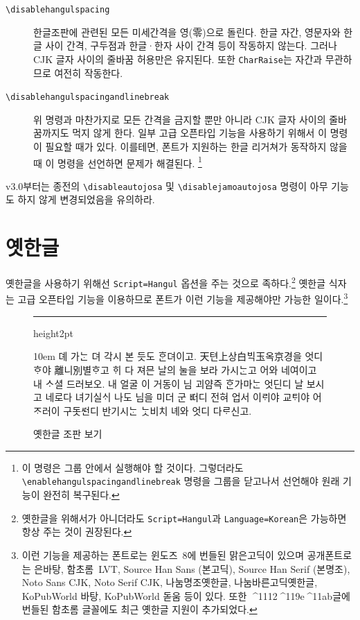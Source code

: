 \documentclass[a4paper]{article}
\def\grayhrule{{\color{white!80!black}\hrule height2pt}}
\def\grayvrule{{\color{white!80!black}\vrule width 2pt}}
\newenvironment{example}
  {\hbox\bgroup\grayvrule
    \vbox\bgroup\hsize\dimexpr\textwidth-4pt\relax
    \grayhrule\kern5pt\leftskip10pt\rightskip10pt
  }{\par\kern5pt\grayhrule\egroup\grayvrule\egroup}
\newenvironment{oldstuff}
  {
    \par\smallskip
    \narrower\small\parindent0pt
  }
  {
    \par\smallskip
  }
\def\cs#1{\texttt{\textbackslash #1}}
\def\hparen#1{{\small\hangulparens(#1)}}
\begin{document}
\begin{description}
  \item[\cs{disablehangulspacing}]
    한글조판에 관련된 모든 미세간격을 영\hparen{零}으로 돌린다. 한글 자간,
    영문자와 한글 사이 간격, 구두점과 한글^^b7한자 사이 간격 등이 작동하지 않는다.
    그러나 CJK 글자 사이의 줄바꿈 허용만은 유지된다. 또한
    \verb|CharRaise|는 자간과 무관하므로 여전히 작동한다.

  \item[\cs{disablehangulspacingandlinebreak}]
    위 명령과 마찬가지로 모든 간격을 금지할 뿐만 아니라 CJK 글자 사이의
    줄바꿈까지도 먹지 않게 한다.
    일부 고급 오픈타입 기능을 사용하기 위해서 이 명령이 필요할 때가 있다.
    이를테면, 폰트가 지원하는 한글 리거쳐가 동작하지 않을 때 이 명령을
    선언하면 문제가 해결된다.%
    \footnote{%
      이 명령은 그룹 안에서 실행해야 할 것이다. 그렇더라도
      \cs{enablehangulspacingandlinebreak} 명령을 그룹을 닫고나서 선언해야
      원래 기능이 완전히 복구된다.
      }

\end{description}
\begin{oldstuff}
v3.0부터는 종전의
\cs{disableautojosa} 및 \cs{disablejamoautojosa} 명령이 아무 기능도 하지 않게
변경되었음을 유의하라.
\end{oldstuff}

\section{옛한글}

옛한글을 사용하기 위해선 \verb|Script=Hangul| 옵션을 주는 것으로 족하다.\footnote{%
  옛한글을 위해서가 아니더라도 \texttt{Script=Hangul}과 \texttt{Language=Korean}은
  가능하면 항상 주는 것이 권장된다.}
옛한글 식자는 고급 오픈타입 기능을 이용하므로
폰트가 이런 기능을 제공해야만 가능한 일이다.\footnote{%
이런 기능을 제공하는 폰트로는 윈도즈~8에 번들된 맑은고딕이
있으며 공개폰트로는 은바탕, 함초롬~LVT, Source Han Sans (본고딕),
Source Han Serif (본명조), Noto Sans CJK, Noto Serif CJK,
나눔명조옛한글, 나눔바른고딕옛한글, KoPubWorld 바탕, KoPubWorld 돋움 등이 있다.
또한
\textsf{^^^^1112^^^^119e^^^^11ab글}에 번들된 함초롬 글꼴에도
최근 옛한글 지원이 추가되었다.}

\begin{figure}
  \begin{example}
    \sffamily \obeylines\leftskip10em
뎨 가ᄂᆞᆫ 뎌 각시 본 듯도 ᄒᆞᆫ뎌이고.
天텬上상白ᄇᆡᆨ玉옥京경을 엇디ᄒᆞ야 離니別별ᄒᆞ고
ᄒᆡ 다 져믄 날의 눌을 보라 가시ᄂᆞᆫ고
\medbreak
어와 네여이고 내 ᄉᆞ셜 드러보오.
내 얼굴 이 거동이 님 괴얌즉 ᄒᆞᆫ가마ᄂᆞᆫ
엇딘디 날 보시고 네로다 녀기실ᄉᆡ
나도 님을 미더 군 ᄠᅥ디 전혀 업서
이ᄅᆡ야 교ᄐᆡ야 어ᄌᆞ러이 구돗ᄯᅥᆫ디
반기시ᄂᆞᆫ ᄂᆞᆺ비치 녜와 엇디 다ᄅᆞ신고.
  \end{example}
  \caption{옛한글 조판 보기}\label{fig:yethangul}
\end{figure}
\end{document}
